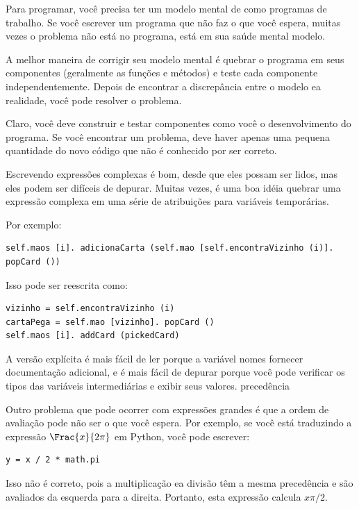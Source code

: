 \documentclass[10pt]{book}
\begin{document}
\begin{exercise}
\begin{v erbatim}
\begin{itemize}
\end{itemize}

Para programar, você precisa ter um modelo mental de como
programas de trabalho. Se você escrever um programa que não faz o que você espera,
muitas vezes o problema não está no programa, está em sua saúde mental
modelo.

A melhor maneira de corrigir seu modelo mental é quebrar o programa
em seus componentes (geralmente as funções e métodos) e teste
cada componente independentemente. Depois de encontrar a discrepância
entre o modelo ea realidade, você pode resolver o problema.

Claro, você deve construir e testar componentes como você
o desenvolvimento do programa. Se você encontrar um problema,
deve haver apenas uma pequena quantidade do novo código
que não é conhecido por ser correto.



Escrevendo expressões complexas é bom, desde que eles possam ser lidos,
mas eles podem ser difíceis de depurar. Muitas vezes, é uma boa idéia
quebrar uma expressão complexa em uma série de atribuições para
variáveis ​​temporárias.

Por exemplo:

\begin{verbatim}
self.maos [i]. adicionaCarta (self.mao [self.encontraVizinho (i)]. popCard ())
\end{verbatim}
%
Isso pode ser reescrita como:

\begin{verbatim}
vizinho = self.encontraVizinho (i)
cartaPega = self.mao [vizinho]. popCard ()
self.maos [i]. addCard (pickedCard)
\end{verbatim}
%
A versão explícita é mais fácil de ler porque a variável
nomes fornecer documentação adicional, e é mais fácil de depurar
porque você pode verificar os tipos das variáveis ​​intermediárias
e exibir seus valores.
\index{} precedência

Outro problema que pode ocorrer com expressões grandes é
que a ordem de avaliação pode não ser o que você espera.
Por exemplo, se você está traduzindo a expressão
$ \Frac {x} {2 \pi} $ em Python, você pode escrever:

\begin{verbatim}
y = x / 2 * math.pi
\end{verbatim}
%
Isso não é correto, pois a multiplicação ea divisão têm
a mesma precedência e são avaliados da esquerda para a direita.
Portanto, esta expressão calcula $ x \pi / 2 $.


\end{v erbatim}
\end{exercise}
\end{document}
